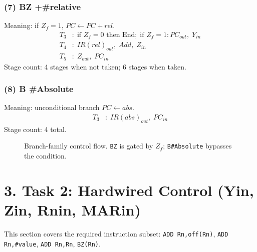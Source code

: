 \documentclass{article}
\begin{document}
\subsubsection*{(7) BZ +\#relative}
Meaning: if \(Z_f=1\), \(PC \leftarrow PC + rel\).
\begin{align*}
T_3 &: \; \text{if } Z_f=0 \text{ then End};\; \text{if } Z_f=1: PC_{out},\; Y_{in} \\
T_4 &: \; IR(rel)_{out},\; Add,\; Z_{in} \\
T_5 &: \; Z_{out},\; PC_{in}
\end{align*}
Stage count: 4 stages when not taken; 6 stages when taken.

\subsubsection*{(8) B \#Absolute}
Meaning: unconditional branch \(PC \leftarrow abs\).
\begin{align*}
T_3 &: \; IR(abs)_{out},\; PC_{in}
\end{align*}
Stage count: 4 total.

\begin{figure}[H]
\centering
{}
\caption{Branch-family control flow. \texttt{BZ} is gated by \(Z_f\); \texttt{B\#Absolute} bypasses the condition.}
\end{figure}

\section*{3. Task 2: Hardwired Control (Yin, Zin, Rnin, MARin)}
This section covers the required instruction subset:
\texttt{ADD Rn,off(Rn)}, \texttt{ADD Rn,\#value}, \texttt{ADD Rn,Rn}, \texttt{BZ(Rn)}.
\end{document}
